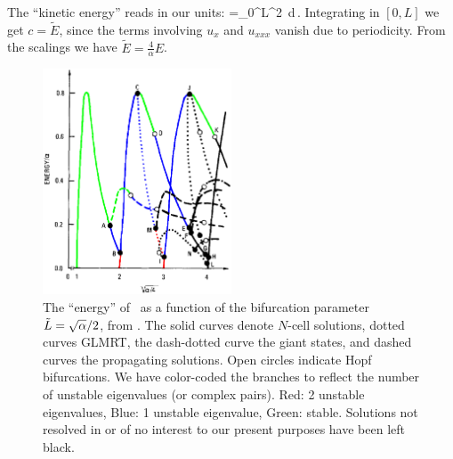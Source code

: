 The ``kinetic energy'' reads in our units:
\beq
	=\int_0^{L}^2\, d\,.
\eeq
Integrating  in $[0,L]$ we get $c=\tilde{E}$,
since the terms involving $u_x$ and $u_{xxx}$ vanish due to periodicity.
From the scalings  we have $\tilde{E}=\frac{4}{\alpha}E$.


\begin{figure}[t]
\centering
\includegraphics[width=0.5\textwidth]{figs/GreeneKimBifColor.eps}
\caption{
	{\small
The ``energy'' of \eqva\ as a function of the bifurcation
parameter $\tilde{L}=\sqrt{\alpha}/2$, from .
The solid curves denote $N$-cell solutions,
dotted curves GLMRT, the dash-dotted curve the
giant states, and dashed curves the propagating solutions.
Open circles indicate Hopf bifurcations. 
We have color-coded the branches to reflect the number of unstable
eigenvalues (or complex pairs). Red: 2 unstable eigenvalues, Blue: 1
unstable eigenvalue, Green: stable. Solutions not 
resolved in  or of no interest
to our present purposes have been left black.
        } %
        }
\label{fig:GreeneKim}
\end{figure}

